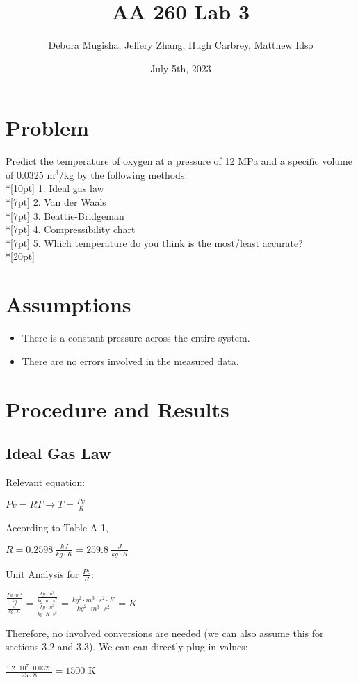 \documentclass{article}
\title{\textbf{AA 260 Lab 3}}
\author{Debora Mugisha, Jeffery Zhang, Hugh Carbrey, Matthew Idso}
\date{July 5th, 2023}
\begin{document}
\maketitle

\section{Problem}

Predict the temperature of oxygen at a pressure of 12 MPa and a specific volume of 0.0325 m\(^3\)/kg
by the following methods:\\*[10pt]
1. Ideal gas law\\*[7pt]
2. Van der Waals\\*[7pt]
3. Beattie-Bridgeman\\*[7pt]
4. Compressibility chart\\*[7pt]
5. Which temperature do you think is the most/least accurate?
\\*[20pt]
\section{Assumptions}

\begin{itemize}
 \item There is a constant pressure across the entire system.
 \item There are no errors involved in the measured data.
\end{itemize}

\section{Procedure and Results}

\subsection{Ideal Gas Law}
Relevant equation:
\begin{center}
\(\displaystyle Pv=RT\rightarrow T=\frac{Pv}{R}\)
\end{center}
According to Table A-1, 
\begin{center}
\(\displaystyle R = 0.2598 \ \frac{kJ}{kg\cdot K}=259.8 \ \frac{J}{kg\cdot K}\)
\end{center}
Unit Analysis for \(\frac{Pv}{R}\):
\begin{center}
\(\displaystyle \frac{\frac{Pa\cdot m^3}{kg}}{\frac{J}{kg\cdot K}}= \frac{\frac{kg\cdot m^3}{kg\cdot m \cdot s^2}}{\frac{kg\cdot m^2}{kg\cdot K \cdot s^2}}= \frac{kg^2\cdot m^3\cdot s^2\cdot K}{kg^2\cdot m^3\cdot s^2}= K\)
\end{center}
Therefore, no involved conversions are needed (we can also assume this for sections 3.2 and 3.3). We can can directly plug in values:
\begin{center}
\(\displaystyle \frac{1.2\cdot 10^7\cdot0.0325}{259.8}= 1500\) K
\end{center}
\clearpage \noindent
\end{document}
